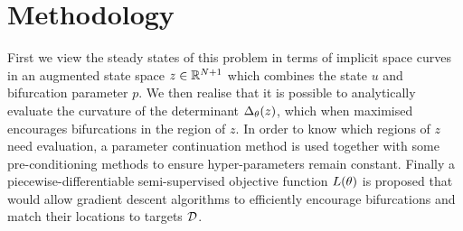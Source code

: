 \section{Methodology}
First we view the steady states of this problem in terms of implicit space curves \cite{Goldman2005CurvatureSurfaces} in an augmented state space $z\in\mathbb{R}^{N+1}$ which combines the state $u$ and bifurcation parameter $p$. We then realise that it is possible to analytically evaluate the curvature of the determinant $\Delta_{\theta}(z)$, which when maximised encourages bifurcations in the region of $z$. In order to know which regions of $z$ need evaluation, a parameter continuation method \cite{Veltz2019PseudoArcLengthContinuation.jl,Farrell2016TheDiagrams} is used together with some pre-conditioning methods to ensure hyper-parameters remain constant. Finally a piecewise-differentiable semi-supervised objective function $L(\theta)$ is proposed that would allow gradient descent algorithms to efficiently encourage bifurcations and match their locations to targets $\mathcal{D}$.


